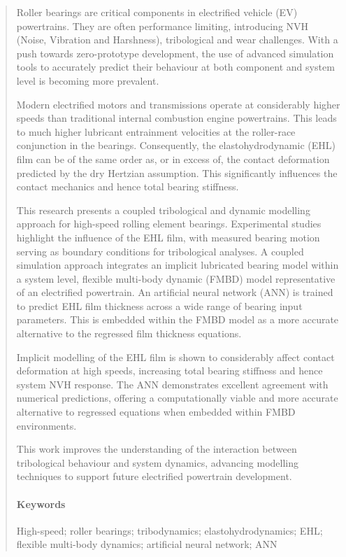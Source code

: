 
\begin{abstract}

Roller bearings are critical components in electrified vehicle (EV) powertrains. They are often performance limiting, introducing NVH (Noise, Vibration and Harshness), tribological and wear challenges. With a push towards zero-prototype development, the use of advanced simulation tools to accurately predict their behaviour at both component and system level is becoming more prevalent.

Modern electrified motors and transmissions operate at considerably higher speeds than traditional internal combustion engine powertrains. This leads to much higher lubricant entrainment velocities at the roller-race conjunction in the bearings. Consequently, the elastohydrodynamic (EHL) film can be of the same order as, or in excess of, the contact deformation predicted by the dry Hertzian assumption. This significantly influences the contact mechanics and hence total bearing stiffness.

This research presents a coupled tribological and dynamic modelling approach for high-speed rolling element bearings. Experimental studies highlight the influence of the EHL film, with measured bearing motion serving as boundary conditions for tribological analyses. A coupled simulation approach integrates an implicit lubricated bearing model within a system level, flexible multi-body dynamic (FMBD) model representative of an electrified powertrain. An artificial neural network (ANN) is trained to predict EHL film thickness across a wide range of bearing input parameters. This is embedded within the FMBD model as a more accurate alternative to the regressed film thickness equations.

Implicit modelling of the EHL film is shown to considerably affect contact deformation at high speeds, increasing total bearing stiffness and hence system NVH response. The ANN demonstrates excellent agreement with numerical predictions, offering a computationally viable and more accurate alternative to regressed equations when embedded within FMBD environments.

This work improves the understanding of the interaction between tribological behaviour and system dynamics, advancing modelling techniques to support future electrified powertrain development.
 
\paragraph{Keywords} High-speed; roller bearings; tribodynamics; elastohydrodynamics; EHL; flexible multi-body dynamics; artificial neural network; ANN

\end{abstract}
